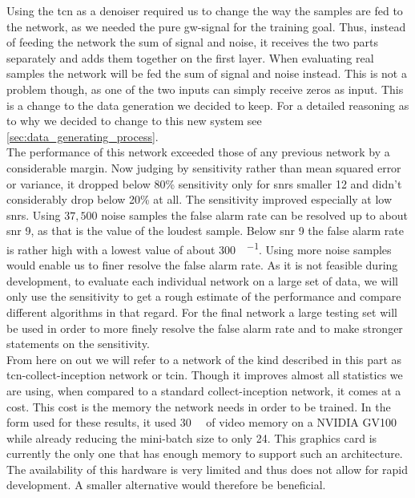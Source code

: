 Using the \gls{tcn} as a denoiser required us to change the way the samples are fed to the network, as we needed the pure \gls{gw}-signal for the training goal. Thus, instead of feeding the network the sum of signal and noise, it receives the two parts separately and adds them together on the first layer. When evaluating real samples the network will be fed the sum of signal and noise instead. This is not a problem though, as one of the two inputs can simply receive zeros as input. This is a change to the data generation we decided to keep. For a detailed reasoning as to why we decided to change to this new system see \autoref{sec:data_generating_process}.\\
The performance of this network exceeded those of any previous network by a considerable margin. Now judging by sensitivity rather than mean squared error or variance, it dropped below 80\% sensitivity only for \gls{snr}s smaller 12 and didn't considerably drop below 20\% at all. The sensitivity improved especially at low \gls{snr}s. Using $37,500$ noise samples the false alarm rate can be resolved up to about \gls{snr} 9, as that is the value of the loudest sample. Below \gls{snr} 9 the false alarm rate is rather high with a lowest value of about \SI[per-mode=fraction]{300}{\samples\per\month}. Using more noise samples would enable us to finer resolve the false alarm rate. As it is not feasible during development, to evaluate each individual network on a large set of data, we will only use the sensitivity to get a rough estimate of the performance and compare different algorithms in that regard. For the final network a large testing set will be used in order to more finely resolve the false alarm rate and to make stronger statements on the sensitivity.\\
From here on out we will refer to a network of the kind described in this part as \gls{tcn}-collect-inception network or \gls{tcin}. Though it improves almost all statistics we are using, when compared to a standard collect-inception network, it comes at a cost. This cost is the memory the network needs in order to be trained. In the form used for these results, it used \SI{30}{\giga\byte} of video memory on a NVIDIA GV100 while already reducing the mini-batch size to only 24. This graphics card is currently the only one that has enough memory to support such an architecture. The availability of this hardware is very limited and thus does not allow for rapid development. A smaller alternative would therefore be beneficial.\\
